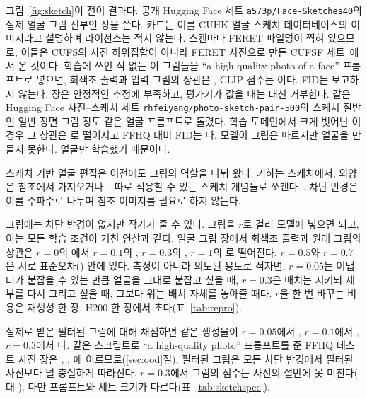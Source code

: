 \documentclass[10pt,twocolumn,a4paper]{article}
\begin{document}
그림~\ref{fig:sketch}이 전이 결과다. 공개 Hugging Face 세트
\texttt{a573p/}\allowbreak\texttt{Face-Sketches40}의 실제 얼굴 그림 전부인 \sketchFaceN{}장을
쓴다. 카드는 이를 CUHK 얼굴 스케치 데이터베이스의 이미지라고 설명하며 라이선스는 적지 않는다.
스캔마다 FERET 파일명이 찍혀 있으므로, 이들은 CUFS의 사진 하위집합이 아니라 FERET 사진으로
만든 CUFSF 세트~\cite{wang2009face,zhang2011coupled}에서 온 것이다. 학습에 쓰인 적 없는 이
그림들을 ``a high-quality photo of a face'' 프롬프트로 넣으면, 회색조 출력과 입력 그림의 상관은 \sketchFaceSC{}, CLIP 점수는
\sketchFaceClip{}이다. FID는 보고하지 않는다. \sketchFaceN{}장은 안정적인 추정에 부족하고,
평가기가 값을 내는 대신 거부한다. 같은 Hugging Face 사진--스케치 세트
\texttt{rhfeiyang/photo-sketch-pair-500}의 스케치 절반인 일반 장면 그림 \sketchSceneN{}장도
같은 얼굴 프롬프트로 돌렸다. 학습 도메인에서 크게 벗어난 이 경우 그 상관은
\sketchSceneSC{}로 떨어지고 FFHQ 대비 FID는 \sketchSceneFid{}다. 모델이 그림은 따르지만
얼굴을 만들지 못한다. 얼굴만 학습했기 때문이다.

스케치 기반 얼굴 편집은 이전에도 그림의 역할을 나눠 왔다. 기하는 스케치에서, 외양은
참조에서 가져오거나~\cite{chen2021deepfaceediting}, 따로 적용할 수 있는 스케치 개념들로
쪼갠다~\cite{xiao2024customsketching}. 차단 반경은 이를 주파수로 나누며 참조 이미지를
필요로 하지 않는다.

그림에는 차단 반경이 없지만 작가가 줄 수 있다. 그림을 $r$로 걸러 모델에 넣으면 되고, 이는
모든 학습 조건이 거친 연산과 같다. 얼굴 그림 \sdialN{}장에서 회색조 출력과 원래 그림의
상관은 $r{=}0$의 \sdialZero{}에서 $r{=}0.1$의 \sdialOneZero{}, $r{=}0.3$의
\sdialThreeZero{}, $r{=}1$의 \sdialOneHundred{}로 떨어진다. $r{=}0.5$와 $r{=}0.7$은 서로
표준오차(\sdialSemFiveZero{}) 안에 있다. 측정이 아니라 의도된 용도로 적자면, $r{=}0.05$는
어댑터가 붙잡을 수 있는 만큼 얼굴을 그대로 붙잡고 싶을 때, $r{=}0.3$은 배치는 지키되 세부를
다시 그리고 싶을 때, 그보다 위는 배치 자체를 놓아줄 때다. $r$을 한 번 바꾸는 비용은 재생성
한 장, H200 한 장에서 \sampleSecImg{}초다(표~\ref{tab:repro}).

실제로 받은 필터된 그림에 대해 채점하면 같은 생성물이 $r{=}0.05$에서 \sdialFZeroFive{},
$r{=}0.1$에서 \sdialFOneZero{}, $r{=}0.3$에서 \sdialFThreeZero{}다. 같은 스크립트로
``a high-quality photo'' 프롬프트를 준 FFHQ 테스트 사진 \oodN{}장은 \oodIndFZeroFive{},
\oodIndFOneZero{}, \oodIndFThreeZero{}에 이르므로(\ref{sec:ood}절), 필터된 그림은 모든
차단 반경에서 필터된 사진보다 덜 충실하게 따라진다. $r{=}0.3$에서 그림의 점수는 사진의
절반에 못 미친다(\sdialFThreeZero{} 대 \oodIndFThreeZero{}). 다만 프롬프트와 세트 크기가
다르다(표~\ref{tab:sketchspec}).
\end{document}
